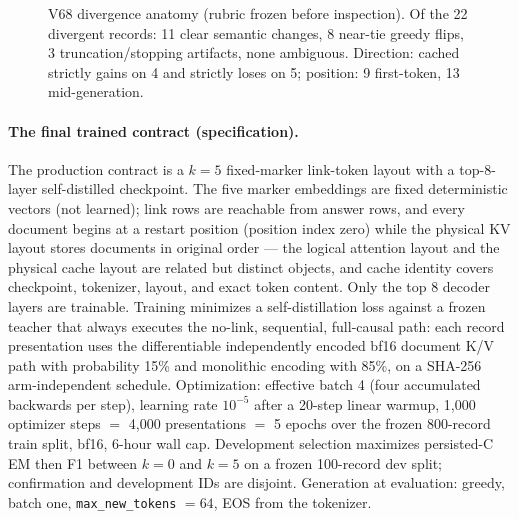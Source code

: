 \begin{table}[H]
\centering\footnotesize
\caption{Anatomy of 22 differing cached/fresh records (V68).
Bidirectional, low-magnitude bf16 perturbation.}
\label{tab:v68anatomy}
\end{table}

\begin{figure}[H]
\centering

\caption{V68 divergence anatomy (rubric frozen before inspection). Of the
22 divergent records: 11 clear semantic changes, 8 near-tie greedy flips,
3 truncation/stopping artifacts, none ambiguous. Direction: cached
strictly gains on 4 and strictly loses on 5; position: 9 first-token,
13 mid-generation.}
\label{fig:anatomy}
\end{figure}

\begin{table}[H]
\centering\footnotesize
\caption{QA non-inferiority under the $-0.02$ floor (paired bootstrap,
seed 47). The 100-record confirmation fails under the \emph{untrained}
contract; the trained contract is in Table~\ref{tab:v70gates}.}
\label{tab:qaconfirmation}
\end{table}

\paragraph{The final trained contract (specification).}
The production contract is a $k{=}5$ fixed-marker link-token layout with a
top-8-layer self-distilled checkpoint. The five marker embeddings are fixed
deterministic vectors (not learned); link rows are reachable from answer
rows, and every document begins at a restart position (position index zero)
while the physical KV layout stores documents in original order --- the
logical attention layout and the physical cache layout are related but
distinct objects, and cache identity covers checkpoint, tokenizer, layout,
and exact token content. Only the top 8 decoder layers are trainable.
Training minimizes a self-distillation loss against a frozen teacher that
always executes the no-link, sequential, full-causal path: each record
presentation uses the differentiable independently encoded bf16 document
K/V path with probability 15\% and monolithic encoding with 85\%, on a
SHA-256 arm-independent schedule. Optimization: effective batch 4 (four
accumulated backwards per step), learning rate $10^{-5}$ after a 20-step
linear warmup, 1{,}000 optimizer steps $=$ 4{,}000 presentations $=$ 5
epochs over the frozen 800-record train split, bf16, 6-hour wall cap.
Development selection maximizes persisted-C EM then F1 between $k{=}0$ and
$k{=}5$ on a frozen 100-record dev split; confirmation and development IDs
are disjoint. Generation at evaluation: greedy, batch one,
\texttt{max\_new\_tokens} ${=} 64$, EOS from the tokenizer.


